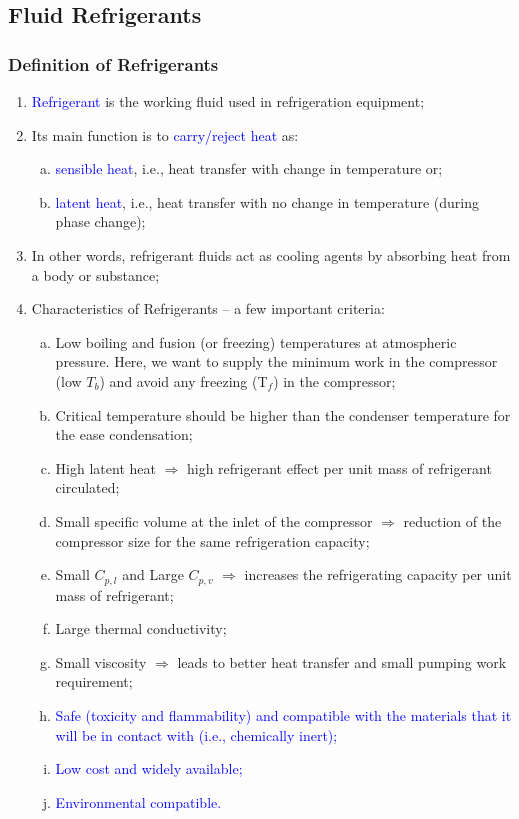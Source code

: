 \documentclass[10pt,compress]{beamer}
\newcommand{\blue}{\textcolor{blue}}
\begin{document}
\subsection{Fluid Refrigerants}
\begin{frame}
 \frametitle{Definition of Refrigerants}
  \begin{enumerate}[1]\scriptsize
   \item <1-> \textcolor{blue}{Refrigerant} is the working fluid used in refrigeration equipment; 
   \item <2-> Its main function is to \textcolor{blue}{carry/reject heat} as:
     \begin{enumerate}[(a)]\scriptsize
        \item<2-> \blue{sensible heat}, i.e., heat transfer with change in temperature or;
        \item<2-> \blue{latent heat}, i.e., heat transfer with no change in temperature (during phase change);
     \end{enumerate}
   \item <3-> In other words, refrigerant fluids act as cooling agents by absorbing heat from a body or substance;
   \item <4-> Characteristics of Refrigerants -- a few important criteria:
     \begin{enumerate}[(a)]\scriptsize
        \item <4-> Low boiling and fusion (or freezing) temperatures at atmospheric pressure. Here, we want to supply the minimum work in the compressor (low $T_{b}$) and avoid any freezing (T$_{f}$) in the compressor; 
        \item <4-> Critical temperature should be higher than the condenser temperature for the ease condensation;
        \item <4-> High latent heat $\Longrightarrow$ high refrigerant effect per unit mass of refrigerant circulated;
        \item <4-> Small specific volume at the inlet of the compressor $\Longrightarrow$ reduction of the compressor size for the same refrigeration capacity;
        \item <4-> Small $C_{p,l}$ and Large $C_{p,v}$ $\Longrightarrow$ increases the refrigerating capacity per unit mass of refrigerant;
        \item <4-> Large thermal conductivity;
        \item <4-> Small viscosity $\Longrightarrow$ leads to better heat transfer and small pumping work requirement;
        \item <4-> \blue{Safe (toxicity and flammability) and compatible with the materials that it will be in contact with (i.e., chemically inert);}
        \item <4-> \blue{Low cost and widely available;}
        \item <4-> \blue{Environmental compatible.}
     \end{enumerate}
  \end{enumerate}
\end{frame}
\end{document}
